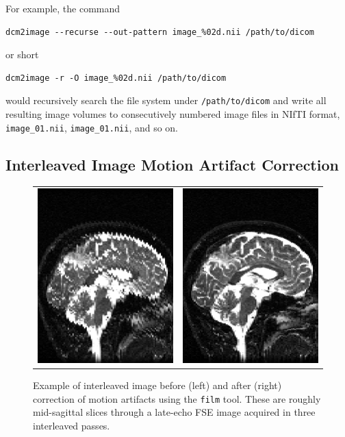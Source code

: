 \documentclass{InsightArticle}
\begin{document}
For example, the command
\begin{verbatim}
dcm2image --recurse --out-pattern image_%02d.nii /path/to/dicom
\end{verbatim}
or short
\begin{verbatim}
dcm2image -r -O image_%02d.nii /path/to/dicom
\end{verbatim}
would recursively search the file system under {\tt /path/to/dicom} and write
all resulting image volumes to consecutively numbered image files in NIfTI
format, {\tt image\_01.nii},  {\tt image\_01.nii}, and so on.

\subsection{Interleaved Image Motion Artifact Correction}

\begin{figure}[tbp]
\begin{center}
\begin{tabular}{cc}
\includegraphics[width=.3\linewidth]{img/film_artifacts}&
\includegraphics[width=.3\linewidth]{img/film_corrected}
\end{tabular}
\end{center}
\caption{Example of interleaved image before (left) and after (right)
  correction of motion artifacts using the {\tt film} tool. These are roughly
  mid-sagittal slices through a late-echo FSE image acquired in three
  interleaved passes.}
\label{fig:InterleavedExample}
\end{figure}
\end{document}
